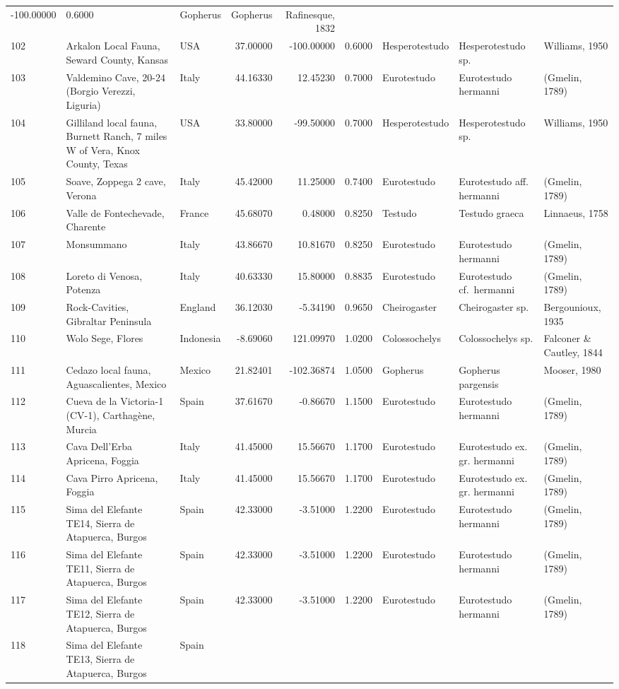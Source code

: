 \documentclass[]{article}
\begin{document}
\begin{longtable}[]{@{}lllrrrlll@{}}
-100.00000 & 0.6000 & Gopherus & Gopherus & Rafinesque,
1832\tabularnewline
102 & Arkalon Local Fauna, Seward County, Kansas & USA & 37.00000 &
-100.00000 & 0.6000 & Hesperotestudo & Hesperotestudo sp. & Williams,
1950\tabularnewline
103 & Valdemino Cave, 20-24 (Borgio Verezzi, Liguria) & Italy & 44.16330
& 12.45230 & 0.7000 & Eurotestudo & Eurotestudo hermanni & (Gmelin,
1789)\tabularnewline
104 & Gilliland local fauna, Burnett Ranch, 7 miles W of Vera, Knox
County, Texas & USA & 33.80000 & -99.50000 & 0.7000 & Hesperotestudo &
Hesperotestudo sp. & Williams, 1950\tabularnewline
105 & Soave, Zoppega 2 cave, Verona & Italy & 45.42000 & 11.25000 &
0.7400 & Eurotestudo & Eurotestudo aff. hermanni & (Gmelin,
1789)\tabularnewline
106 & Valle de Fontechevade, Charente & France & 45.68070 & 0.48000 &
0.8250 & Testudo & Testudo graeca & Linnaeus, 1758\tabularnewline
107 & Monsummano & Italy & 43.86670 & 10.81670 & 0.8250 & Eurotestudo &
Eurotestudo hermanni & (Gmelin, 1789)\tabularnewline
108 & Loreto di Venosa, Potenza & Italy & 40.63330 & 15.80000 & 0.8835 &
Eurotestudo & Eurotestudo cf.~hermanni & (Gmelin, 1789)\tabularnewline
109 & Rock-Cavities, Gibraltar Peninsula & England & 36.12030 & -5.34190
& 0.9650 & Cheirogaster & Cheirogaster sp. & Bergounioux,
1935\tabularnewline
110 & Wolo Sege, Flores & Indonesia & -8.69060 & 121.09970 & 1.0200 &
Colossochelys & Colossochelys sp. & Falconer \& Cautley,
1844\tabularnewline
111 & Cedazo local fauna, Aguascalientes, Mexico & Mexico & 21.82401 &
-102.36874 & 1.0500 & Gopherus & Gopherus pargensis & Mooser,
1980\tabularnewline
112 & Cueva de la Victoria-1 (CV-1), Carthagène, Murcia & Spain &
37.61670 & -0.86670 & 1.1500 & Eurotestudo & Eurotestudo hermanni &
(Gmelin, 1789)\tabularnewline
113 & Cava Dell'Erba Apricena, Foggia & Italy & 41.45000 & 15.56670 &
1.1700 & Eurotestudo & Eurotestudo ex. gr. hermanni & (Gmelin,
1789)\tabularnewline
114 & Cava Pirro Apricena, Foggia & Italy & 41.45000 & 15.56670 & 1.1700
& Eurotestudo & Eurotestudo ex. gr. hermanni & (Gmelin,
1789)\tabularnewline
115 & Sima del Elefante TE14, Sierra de Atapuerca, Burgos & Spain &
42.33000 & -3.51000 & 1.2200 & Eurotestudo & Eurotestudo hermanni &
(Gmelin, 1789)\tabularnewline
116 & Sima del Elefante TE11, Sierra de Atapuerca, Burgos & Spain &
42.33000 & -3.51000 & 1.2200 & Eurotestudo & Eurotestudo hermanni &
(Gmelin, 1789)\tabularnewline
117 & Sima del Elefante TE12, Sierra de Atapuerca, Burgos & Spain &
42.33000 & -3.51000 & 1.2200 & Eurotestudo & Eurotestudo hermanni &
(Gmelin, 1789)\tabularnewline
118 & Sima del Elefante TE13, Sierra de Atapuerca, Burgos & Spain &

\end{longtable}
\end{document}
